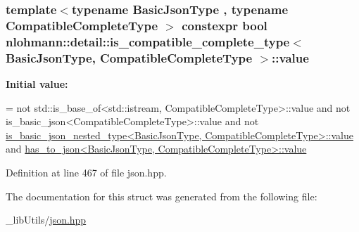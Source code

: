 \subsubsection[{\texorpdfstring{value}{value}}]{\setlength{\rightskip}{0pt plus 5cm}template$<$typename Basic\+Json\+Type , typename Compatible\+Complete\+Type $>$ constexpr bool {\bf nlohmann\+::detail\+::is\+\_\+compatible\+\_\+complete\+\_\+type}$<$ Basic\+Json\+Type, Compatible\+Complete\+Type $>$\+::value\hspace{0.3cm}{\ttfamily [static]}}\hypertarget{structnlohmann_1_1detail_1_1is__compatible__complete__type_a34bed4700a302b79feb045b6bdbda9aa}{}\label{structnlohmann_1_1detail_1_1is__compatible__complete__type_a34bed4700a302b79feb045b6bdbda9aa}
{\bfseries Initial value\+:}
\begin{DoxyCode}
=
        not std::is\_base\_of<std::istream, CompatibleCompleteType>::value and
        not is\_basic\_json<CompatibleCompleteType>::value and
        not 
      \hyperlink{structnlohmann_1_1detail_1_1is__basic__json__nested__type_aee5fee744e5298a78d557f2ee5f090db}{is\_basic\_json\_nested\_type<BasicJsonType, CompatibleCompleteType>::value}
       and
        \hyperlink{structnlohmann_1_1detail_1_1has__to__json_a18e260c3c6f10328637c4427d3cb3a31}{has\_to\_json<BasicJsonType, CompatibleCompleteType>::value}
\end{DoxyCode}


Definition at line 467 of file json.\+hpp.



The documentation for this struct was generated from the following file\+:\begin{DoxyCompactItemize}
\item 
\+\_\+lib\+Utils/\hyperlink{json_8hpp}{json.\+hpp}\end{DoxyCompactItemize}
